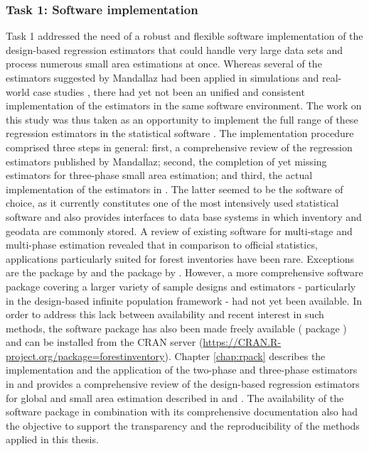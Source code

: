 \subsubsection{Task 1: Software implementation} %


Task 1 addressed the need of a robust and flexible software implementation of the design-based regression estimators that could handle very large data sets and process numerous small area estimations at once. Whereas several of the estimators suggested by Mandallaz had been applied in simulations and real-world case studies \citep{mandallaz2013a, mandallaz2013b, mandallaz2013c, massey2014a, massey2015a, massey2015b}, there had yet not been an unified and consistent implementation of the estimators in the same software environment. The work on this study was thus taken as an opportunity to implement the full range of these regression estimators in the statistical software  \citep{R}. The implementation procedure comprised three steps in general: first, a comprehensive review of the regression estimators published by Mandallaz; second, the completion of yet missing estimators for three-phase small area estimation; and third, the actual implementation of the estimators in . The latter seemed to be the software of choice, as it currently constitutes one of the most intensively used statistical software and also provides interfaces to data base systems in which inventory and geodata are commonly stored. A review of existing software for multi-stage and multi-phase estimation revealed that in comparison to official statistics, applications particularly suited for forest inventories have been rare. Exceptions are the  package  by \citet{josae2015} and the  package by \citet{cullmann2016}. However, a more comprehensive software package covering a larger variety of sample designs and estimators - particularly in the design-based infinite population framework - had not yet been available. In order to address this lack between availability and recent interest in such methods, the software package has also been made freely available ( package ) and can be installed from the CRAN server (\url{https://CRAN.R-project.org/package=forestinventory}). Chapter \ref{chap:rpack} describes the implementation and the application of the two-phase and three-phase estimators in  and provides a comprehensive review of the design-based regression estimators for global and small area estimation described in \citet{mandallaz2008, mandallaz2013a, mandallaz2013c} and \citet{mandallaz2013b}. The availability of the software package in combination with its comprehensive documentation also had the objective to support the transparency and the reproducibility of the methods applied in this thesis.


